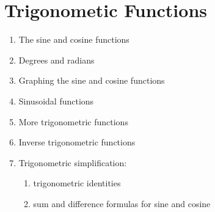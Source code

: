 
\chapter{Trigonometic Functions}

\begin{enumerate}
\item The sine and cosine functions

\item Degrees and radians

\item Graphing the sine and cosine functions

\item Sinusoidal functions

\item More trigonometric functions

\item Inverse trigonometric functions

\item Trigonometric simplification:
  \begin{enumerate}
  \item trigonometric identities

  \item sum and difference formulas for sine and cosine
  \end{enumerate}
\end{enumerate}

